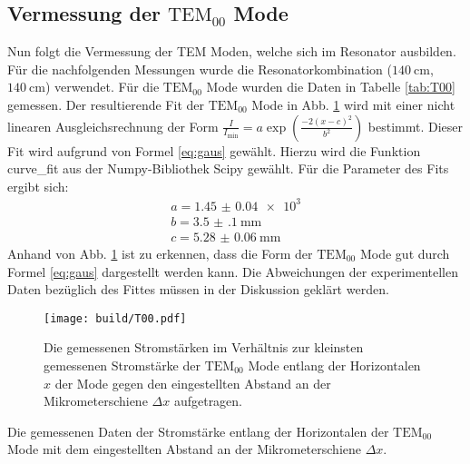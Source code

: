 \subsection{Vermessung der $\text{TEM}_{00}$ Mode}
Nun folgt die Vermessung der TEM Moden, welche sich im Resonator ausbilden. Für die nachfolgenden Messungen wurde die Resonatorkombination ($\SI{140}{\centi\meter}$,$\SI{140}{\centi\meter}$) verwendet.
Für die $\text{TEM}_\text{00}$ Mode wurden die Daten in Tabelle \ref{tab:T00} gemessen. Der resultierende Fit der $\text{TEM}_\text{00}$ Mode in Abb. \ref{fig:T00} wird mit einer nicht linearen Ausgleichsrechnung der Form $\frac{I}{I_\text{min}} = a \exp \left( \frac{-2 (x-c)^2}{b^2}\right)$
bestimmt. Dieser Fit wird aufgrund von Formel \eqref{eq:gaus} gewählt. Hierzu wird die Funktion curve\_fit aus der Numpy-Bibliothek Scipy \cite{scipy} gewählt. Für die Parameter des Fits ergibt sich:
\begin{gather*}
a = \num{1.45(4)e3}\\
b = \SI{3.5(1)}{\milli\meter}\\
c = \SI{5.28(6)}{\milli\meter}
\end{gather*}
Anhand von Abb. \ref{fig:T00} ist zu erkennen, dass die Form der $\text{TEM}_\text{00}$ Mode gut durch Formel \eqref{eq:gaus} dargestellt werden kann. Die Abweichungen der experimentellen Daten bezüglich des Fittes müssen in der Diskussion geklärt werden.



\begin{figure}
	\centering
	\texttt{[image: build/T00.pdf]}
	\caption{Die gemessenen Stromstärken im Verhältnis zur kleinsten gemessenen Stromstärke der $\text{TEM}_{00}$ Mode entlang der Horizontalen $x$ der Mode gegen den eingestellten Abstand an der Mikrometerschiene $\varDelta x$ aufgetragen.}
	\label{fig:T00}
\end{figure}

\begin{table}
	\centering
	\caption{Die gemessenen Daten der Stromstärke entlang der Horizontalen der $\text{TEM}_{\text{00}}$ Mode mit dem eingestellten Abstand an der Mikrometerschiene $\varDelta x$.}
	
	\label{tab:T00}
\end{table}


